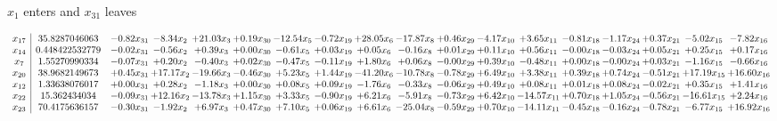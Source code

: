 \documentclass[9pt]{article}
\begin{document}
 $ x_{1} $ enters and $ x_{31} $ leaves 

 \[\begin{array}{c| c c@{\hskip 2pt} c@{\hskip 2pt} c@{\hskip 2pt} c@{\hskip 2pt} c@{\hskip 2pt} c@{\hskip 2pt} c@{\hskip 2pt} c@{\hskip 2pt} c@{\hskip 2pt} c@{\hskip 2pt} c@{\hskip 2pt} c@{\hskip 2pt} c@{\hskip 2pt} c@{\hskip 2pt} c@{\hskip 2pt} c@{\hskip 2pt} }
 x_{17}   &  35.8287046063 & -0.82 x_{31} & -8.34 x_{2} & + 21.03 x_{3} & +  0.19 x_{30} & -12.54 x_{5} & -0.72 x_{19} & + 28.05 x_{6} & -17.87 x_{8} & +  0.46 x_{29} & -4.17 x_{10} & +  3.65 x_{11} & -0.81 x_{18} & -1.17 x_{24} & +  0.37 x_{21} & -5.02 x_{15} & -7.82 x_{16}\\
 x_{14}   &  0.448422532779 & -0.02 x_{31} & -0.56 x_{2} & +  0.39 x_{3} & +  0.00 x_{30} & -0.61 x_{5} & +  0.03 x_{19} & +  0.05 x_{6} & -0.16 x_{8} & +  0.01 x_{29} & +  0.11 x_{10} & +  0.56 x_{11} & -0.00 x_{18} & -0.03 x_{24} & +  0.05 x_{21} & +  0.25 x_{15} & +  0.17 x_{16}\\
 x_{7}   &  1.55270990334 & -0.07 x_{31} & +  0.20 x_{2} & -0.40 x_{3} & +  0.02 x_{30} & -0.47 x_{5} & -0.11 x_{19} & +  1.80 x_{6} & +  0.06 x_{8} & -0.00 x_{29} & +  0.39 x_{10} & -0.48 x_{11} & +  0.00 x_{18} & -0.00 x_{24} & +  0.03 x_{21} & -1.16 x_{15} & -0.66 x_{16}\\
 x_{20}   &  38.9682149673 & +  0.45 x_{31} & + 17.17 x_{2} & -19.66 x_{3} & -0.46 x_{30} & +  5.23 x_{5} & +  1.44 x_{19} & -41.20 x_{6} & -10.78 x_{8} & -0.78 x_{29} & +  6.49 x_{10} & +  3.38 x_{11} & +  0.39 x_{18} & +  0.74 x_{24} & -0.51 x_{21} & + 17.19 x_{15} & + 16.60 x_{16}\\
 x_{12}   &  1.33638076017 & +  0.00 x_{31} & +  0.28 x_{2} & -1.18 x_{3} & +  0.00 x_{30} & +  0.08 x_{5} & +  0.09 x_{19} & -1.76 x_{6} & -0.33 x_{8} & -0.06 x_{29} & +  0.49 x_{10} & +  0.08 x_{11} & +  0.01 x_{18} & +  0.08 x_{24} & -0.02 x_{21} & +  0.35 x_{15} & +  1.41 x_{16}\\
 x_{22}   &  15.362434034 & -0.09 x_{31} & + 12.16 x_{2} & -13.78 x_{3} & +  1.15 x_{30} & +  3.33 x_{5} & -0.90 x_{19} & +  6.21 x_{6} & -5.91 x_{8} & -0.73 x_{29} & +  6.42 x_{10} & -14.57 x_{11} & +  0.70 x_{18} & +  1.05 x_{24} & -0.56 x_{21} & -16.61 x_{15} & +  2.24 x_{16}\\
 x_{23}   &  70.4175636157 & -0.30 x_{31} & -1.92 x_{2} & +  6.97 x_{3} & +  0.47 x_{30} & +  7.10 x_{5} & +  0.06 x_{19} & +  6.61 x_{6} & -25.04 x_{8} & -0.59 x_{29} & +  0.70 x_{10} & -14.11 x_{11} & -0.45 x_{18} & -0.16 x_{24} & -0.78 x_{21} & -6.77 x_{15} & + 16.92 x_{16}\\

\end{array}\]
\end{document}
